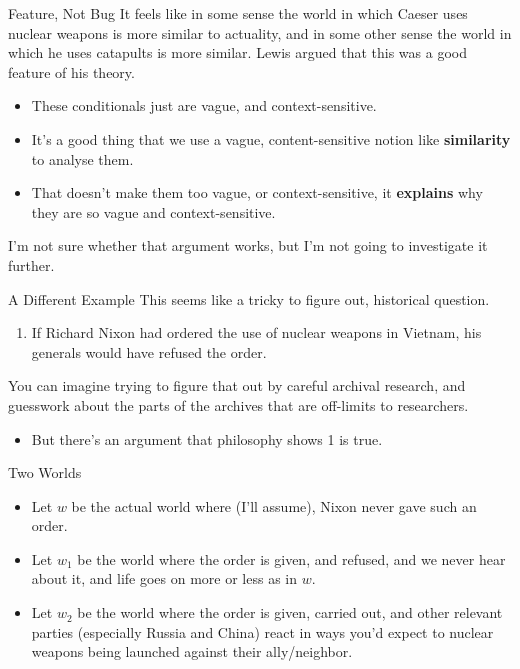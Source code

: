 \documentclass[
  ignorenonframetext,
]{beamer}
\providecommand{\tightlist}{%
  \setlength{\itemsep}{0pt}\setlength{\parskip}{0pt}}
\renewcommand{\,}{\text{, }}
\begin{document}
\begin{frame}{Feature, Not Bug}
\protect\hypertarget{feature-not-bug}{}
It feels like in some sense the world in which Caeser uses nuclear
weapons is more similar to actuality, and in some other sense the world
in which he uses catapults is more similar. Lewis argued that this was a
good feature of his theory.

\begin{itemize}
\tightlist
\item
  These conditionals just are vague, and context-sensitive.
\item
  It's a good thing that we use a vague, content-sensitive notion like
  \textbf{similarity} to analyse them.
\item
  That doesn't make them too vague, or context-sensitive, it
  \textbf{explains} why they are so vague and context-sensitive. \pause 
\end{itemize}

I'm not sure whether that argument works, but I'm not going to
investigate it further.
\end{frame}

\begin{frame}{A Different Example}
\protect\hypertarget{a-different-example}{}
This seems like a tricky to figure out, historical question.

\begin{enumerate}
\tightlist
\item
  If Richard Nixon had ordered the use of nuclear weapons in Vietnam,
  his generals would have refused the order. \pause 
\end{enumerate}

You can imagine trying to figure that out by careful archival research,
and guesswork about the parts of the archives that are off-limits to
researchers. \pause 

\begin{itemize}
\tightlist
\item
  But there's an argument that philosophy shows 1 is true.
\end{itemize}
\end{frame}

\begin{frame}{Two Worlds}
\protect\hypertarget{two-worlds}{}
\begin{itemize}
\tightlist
\item
  Let \(w\) be the actual world where (I'll assume), Nixon never gave
  such an order.
\item
  Let \(w_1\) be the world where the order is given, and refused, and we
  never hear about it, and life goes on more or less as in \(w\).
\item
  Let \(w_2\) be the world where the order is given, carried out, and
  other relevant parties (especially Russia and China) react in ways
  you'd expect to nuclear weapons being launched against their
  ally/neighbor.
\end{itemize}
\end{frame}
\end{document}
